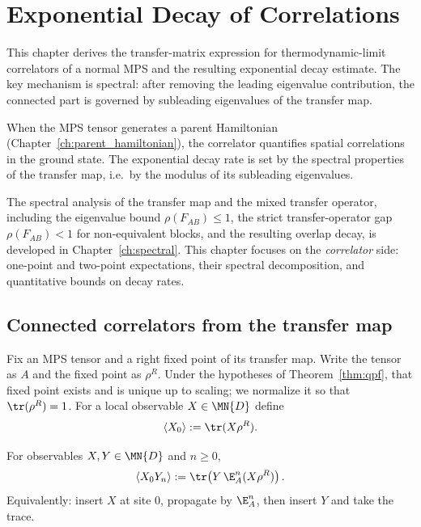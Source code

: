 \chapter{Exponential Decay of Correlations}\label{ch:correlations}

This chapter derives the transfer-matrix expression for thermodynamic-limit
correlators of a normal MPS and the resulting exponential decay estimate.
The key mechanism is spectral: after removing the leading eigenvalue
contribution, the connected part is governed by subleading eigenvalues of the
transfer map.

When the MPS tensor generates a parent Hamiltonian
(Chapter~\ref{ch:parent_hamiltonian}), the correlator quantifies spatial
correlations in the ground state. The exponential decay rate is set by the
spectral properties of the transfer map, i.e.\ by the modulus of its
subleading eigenvalues.

The spectral analysis of the transfer map and the mixed transfer operator,
including the eigenvalue bound $\rho(F_{AB}) \le 1$, the strict
transfer-operator gap $\rho(F_{AB}) < 1$ for non-equivalent blocks, and the resulting
overlap decay, is developed in Chapter~\ref{ch:spectral}. This chapter
focuses on the \emph{correlator} side: one-point and two-point expectations,
their spectral decomposition, and quantitative bounds on decay rates.

\section{Connected correlators from the transfer map}

\begin{definition}\label{def:one_point_expectation}
    \leanok
    Fix an MPS tensor and a right fixed point of its transfer map.
    Write the tensor as $A$ and the fixed point as $\rho^R$.
    Under the hypotheses of Theorem~\ref{thm:qpf}, that fixed point exists
    and is unique up to scaling; we normalize it so that $\tr(\rho^R)=1$.
    For a local observable $X \in \MN{D}$ define
    \[
        \langle X_0 \rangle := \tr(X\rho^R).
    \]
\end{definition}

\begin{definition}\label{def:two_point_expectation}
    \leanok
    For observables $X,Y \in \MN{D}$ and $n\ge 0$,
    \[
        \langle X_0 Y_n \rangle
        := \tr\!\left(Y\,\E_A^n(X\rho^R)\right).
    \]
    Equivalently: insert $X$ at site $0$, propagate by $\E_A^n$, then insert
    $Y$ and take the trace.
\end{definition}


